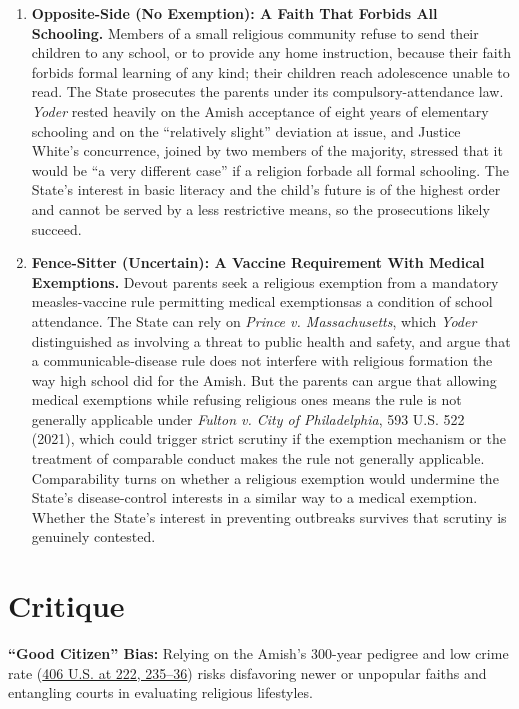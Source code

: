 \documentclass[12pt]{article}
\begin{document}
\begin{enumerate}
\item \textbf{Opposite-Side (No Exemption): A Faith That Forbids All Schooling.} Members of a small religious community refuse to send their children to any school, or to provide any home instruction, because their faith forbids formal learning of any kind; their children reach adolescence unable to read. The State prosecutes the parents under its compulsory-attendance law. \textit{Yoder} rested heavily on the Amish acceptance of eight years of elementary schooling and on the ``relatively slight'' deviation at issue, and Justice White's concurrence, joined by two members of the majority, stressed that it would be ``a very different case'' if a religion forbade all formal schooling. The State's interest in basic literacy and the child's future is of the highest order and cannot be served by a less restrictive means, so the prosecutions likely succeed.

\item \textbf{Fence-Sitter (Uncertain): A Vaccine Requirement With Medical Exemptions.} Devout parents seek a religious exemption from a mandatory measles-vaccine rule permitting medical exemptionsas a condition of school attendance. The State can rely on \textit{Prince v. Massachusetts}, which \textit{Yoder} distinguished as involving a threat to public health and safety, and argue that a communicable-disease rule does not interfere with religious formation the way high school did for the Amish. But the parents can argue that allowing medical exemptions while refusing religious ones means the rule is not generally applicable under \textit{Fulton v. City of Philadelphia}, 593 U.S. 522 (2021), which could trigger strict scrutiny if the exemption mechanism or the treatment of comparable conduct makes the rule not generally applicable. Comparability turns on whether a religious exemption would undermine the State's disease-control interests in a similar way to a medical exemption. Whether the State's interest in preventing outbreaks survives that scrutiny is genuinely contested.

\end{enumerate}

\section{Critique}
\textbf{``Good Citizen'' Bias:} Relying on the Amish's 300-year pedigree and low crime rate (\href{https://supreme.justia.com/cases/federal/us/406/205/}{406 U.S. at 222, 235--36}) risks disfavoring newer or unpopular faiths and entangling courts in evaluating religious lifestyles.
\end{document}
